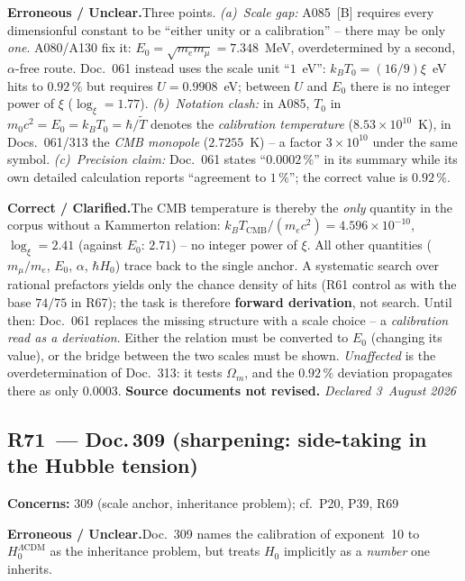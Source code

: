 \smallskip\noindent\textbf{Erroneous / Unclear.}\quad Three points.
\emph{(a)~Scale gap:} A085~[B] requires every dimensionful constant to
be \enquote{either unity or a calibration} -- there may be only
\emph{one}. A080/A130 fix it: $E_0 = \sqrt{m_em_\mu} = 7.348$~MeV,
overdetermined by a second, $\alpha$-free route. Doc.~061 instead uses
the scale unit \enquote{$1$~eV}: $k_BT_0 = (16/9)\xi$~eV hits to
$0.92\,\%$ but requires $U = 0.9908$~eV; between $U$ and $E_0$ there is
no integer power of $\xi$ ($\log_\xi = 1.77$).
\emph{(b)~Notation clash:} in A085, $T_0$ in
$m_0c^2 = E_0 = k_BT_0 = \hbar/\tilde T$ denotes the \emph{calibration
temperature} ($8.53\times10^{10}$~K), in Docs.~061/313 the \emph{CMB
monopole} ($2.7255$~K) -- a factor $3\times10^{10}$ under the same
symbol. \emph{(c)~Precision claim:} Doc.~061 states
\enquote{$0.0002\,\%$} in its summary while its own detailed
calculation reports \enquote{agreement to $1\,\%$}; the correct value is
$0.92\,\%$.

\smallskip\noindent\textbf{Correct / Clarified.}\quad The CMB
temperature is thereby the \emph{only} quantity in the corpus without a
Kammerton relation: $k_BT_\text{CMB}/(m_ec^2) = 4.596\times10^{-10}$,
$\log_\xi = 2.41$ (against $E_0$: $2.71$) -- no integer power of $\xi$.
All other quantities ($m_\mu/m_e$, $E_0$, $\alpha$, $\hbar H_0$) trace
back to the single anchor. A systematic search over rational prefactors
yields only the chance density of hits (R61 control as with the base
$74/75$ in R67); the task is therefore \textbf{forward derivation}, not
search. Until then: Doc.~061 replaces the missing structure with a scale
choice -- a \emph{calibration read as a derivation}. Either the relation
must be converted to $E_0$ (changing its value), or the bridge between
the two scales must be shown. \emph{Unaffected} is the
overdetermination of Doc.~313: it tests $\Omega_m$, and the $0.92\,\%$
deviation propagates there as only $0.0003$.
\textbf{Source documents not revised.} \emph{Declared 3~August 2026}

\medskip

\subsection*{R71~--- Doc.\,309 (sharpening: side-taking in the Hubble
tension)}

\noindent\textbf{Concerns:} 309 (scale anchor, inheritance problem);
cf.\ P20, P39, R69

\smallskip\noindent\textbf{Erroneous / Unclear.}\quad Doc.~309 names the
calibration of exponent~10 to $H_0^{\Lambda\text{CDM}}$ as the
inheritance problem, but treats $H_0$ implicitly as a \emph{number} one
inherits.

